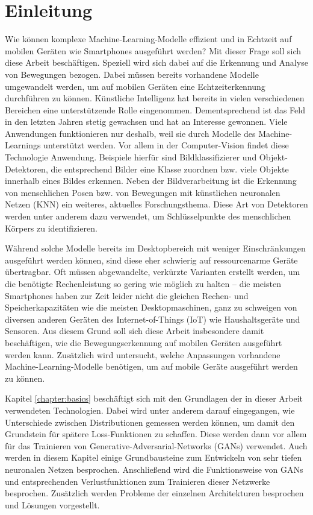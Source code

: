 \chapter{Einleitung}
Wie können komplexe Machine-Learning-Modelle effizient und in Echtzeit auf
mobilen Geräten wie Smartphones ausgeführt werden? Mit dieser Frage soll sich
diese Arbeit beschäftigen. Speziell wird sich dabei auf die Erkennung und
Analyse von Bewegungen bezogen. Dabei müssen bereits vorhandene Modelle
umgewandelt werden, um auf mobilen Geräten eine Echtzeiterkennung durchführen zu
können. Künstliche Intelligenz hat bereits in vielen verschiedenen Bereichen
eine unterstützende Rolle eingenommen.  Dementsprechend ist das Feld in den
letzten Jahren stetig gewachsen und hat an Interesse gewonnen. Viele Anwendungen
funktionieren nur deshalb, weil sie durch Modelle des Machine-Learnings
unterstützt werden. Vor allem in der Computer-Vision findet diese Technologie
Anwendung. Beispiele hierfür sind Bildklassifizierer und Objekt-Detektoren, die
entsprechend Bilder eine Klasse zuordnen bzw. viele Objekte innerhalb eines
Bildes erkennen. Neben der Bildverarbeitung ist die Erkennung von menschlichen
Posen bzw. von Bewegungen mit künstlichen neuronalen Netzen (KNN) ein weiteres,
aktuelles Forschungsthema. Diese Art von Detektoren werden unter anderem dazu
verwendet, um Schlüs\-sel\-punkte des menschlichen Körpers zu identifizieren.

Während solche Modelle bereits im Desktopbereich mit weniger Einschränkungen
ausgeführt werden können, sind diese eher schwierig auf ressourcenarme Geräte
übertragbar. Oft müssen abgewandelte, verkürzte Varianten erstellt werden, um
die benötigte Rechenleistung so gering wie möglich zu halten -- die meisten
Smartphones haben zur Zeit leider nicht die gleichen Rechen- und
Speicherkapazitäten wie die meisten Desktopmaschinen, ganz zu schweigen von
diversen anderen Geräten des Internet-of-Things (IoT) wie Haushaltsgeräte und
Sensoren. Aus diesem Grund soll sich diese Arbeit insbesondere damit
beschäftigen, wie die Bewegungserkennung auf mobilen Geräten ausgeführt werden
kann. Zusätzlich wird untersucht, welche Anpassungen vorhandene
Machine-Learning-Modelle benötigen, um auf mobile Geräte ausgeführt werden zu
können.

Kapitel \ref{chapter:basics} beschäftigt sich mit den Grundlagen der in dieser
Arbeit verwendeten Technologien. Dabei wird unter anderem darauf eingegangen,
wie Unterschiede zwischen Distributionen gemessen werden können, um damit den
Grundstein für spätere Loss-Funktionen zu schaffen. Diese werden dann vor allem
für das Trainieren von Generative-Adversarial-Networks (GANs) verwendet. Auch
werden in diesem Kapitel einige Grundbausteine zum Entwickeln von sehr tiefen
neuronalen Netzen besprochen. Anschließend wird die Funktionsweise von GANs und
entsprechenden Verlustfunktionen zum Trainieren dieser Netzwerke besprochen.
Zusätzlich werden Probleme der einzelnen Architekturen besprochen und Lösungen
vorgestellt.

